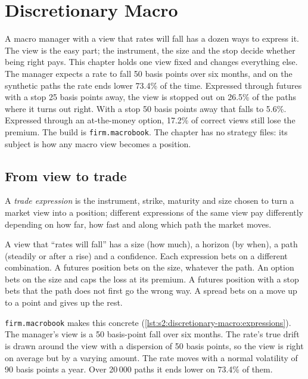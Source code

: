 \chapter{Discretionary Macro}\label{ch:s2:discretionary-macro}

A macro manager with a view that rates will fall has a dozen ways to express it. The view is the easy part; the instrument, the size and the stop
decide whether being right pays. This chapter holds one view fixed and changes everything else. The manager expects a rate to fall 50 basis points
over six months, and on the synthetic paths the rate ends lower 73.4\% of the time. Expressed through futures with a stop 25 basis points away, the
view is stopped out on 26.5\% of the paths where it turns out right. With a stop 50 basis points away that falls to 5.6\%. Expressed through an
at-the-money option, 17.2\% of correct views still lose the premium. The build is \texttt{firm.macrobook}. The chapter has no strategy files: its
subject is how any macro view becomes a position.

\section{From view to trade}

\begin{definition}\label{def:s2:discretionary-macro:expression}
A \emph{trade expression} is the instrument, strike, maturity and size chosen to turn a market view into a position; different
expressions of the same view pay differently depending on how far, how fast and along which path the market moves.
\end{definition}

A view that ``rates will fall'' has a size (how much), a horizon (by when), a path (steadily or after a rise) and a confidence. Each expression bets
on a different combination. A futures position bets on the size, whatever the path. An option bets on the size and caps the loss at its premium. A
futures position with a stop bets that the path does not first go the wrong way. A spread bets on a move up to a point and gives up the rest.

\texttt{firm.macrobook} makes this concrete (\cref{lst:s2:discretionary-macro:expressions}). The manager's view is a 50 basis-point fall over six
months. The rate's true drift is drawn around the view with a dispersion of 50 basis points, so the view is right on average but by a varying amount.
The rate moves with a normal volatility of 90 basis points a year. Over 20\,000 paths it ends lower on 73.4\% of them.

